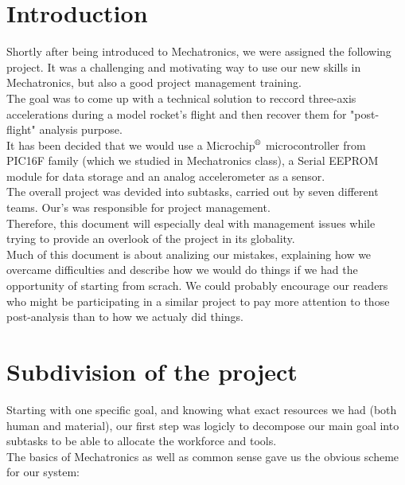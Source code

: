 \documentclass[12pt]{article}
\begin{document}


\newpage
\tableofcontents
\newpage

\section{Introduction}

	Shortly after being introduced to Mechatronics, we were assigned the following project. It was a challenging and motivating way to use our new skills in Mechatronics, but also a good project management training.\\
	The goal was to come up with a technical solution to reccord three-axis accelerations during a model rocket's flight and then recover them for "post-flight" analysis purpose.\\
	It has been decided that we would use a Microchip$^{\mbox{\scriptsize{\textregistered}}}$  microcontroller from PIC16F family (which we studied in Mechatronics class), a Serial EEPROM  module for data storage and an analog accelerometer as a sensor.\\
	The overall project was devided into subtasks, carried out by seven different teams. Our's was responsible for project management.\\
	Therefore, this document will especially deal with management issues while trying to provide an overlook of the project in its globality.\\
	Much of this document is about analizing our mistakes, explaining how we overcame difficulties and describe how we would do things if we had the opportunity of starting from scrach. We could probably encourage our readers who might be participating in a similar project to pay more attention to those post-analysis than to how we actualy did things.
\newpage
\section{Subdivision of the project}

	Starting with one specific goal, and knowing what exact resources we had (both human and material), our first step was logicly to decompose our main goal into subtasks to be able to allocate the workforce and tools.\\

	The basics of Mechatronics as well as common sense gave us the obvious scheme for our system:

	\begin{center}
	
	\end{center}
	
\end{document}
